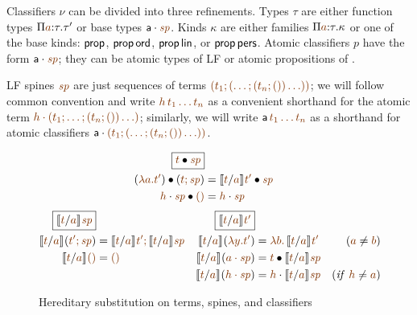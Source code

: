 \noindent
Classifiers $\nu$ can be divided into three refinements.  Types $\tau$
are either function types $\lfpi{a}{\tau}{\tau'}$ or base types
$\lfroot{\sf a}{\spi}$.  Kinds $\kappa$ are either families
$\lfpi{a}{\tau}{\kappa}$ or one of the base kinds: ${\sf prop}$, ${\sf
  prop}\,{\sf ord}$, ${\sf prop}\,{\sf lin}$, or ${\sf prop}\,{\sf
  pers}$. Atomic classifiers $p$ have the form $\lfroot{\sf a}{\spi}$;
they can be atomic types of LF or atomic propositions of \sls.

LF spines $\lf\spi$ are just sequences of terms $\lf{(t_1; (\ldots;
  (t_n;())\ldots))}$; we will follow common convention and write
$\lf{h\,t_1\ldots t_n}$ as a convenient shorthand for the atomic term
$\lf{\lfroot{h}{(t_1; \ldots; (t_n;())\ldots)}}$; similarly, we will
write ${\sf a}\,\lf{t_1\ldots t_n}$ as a shorthand for atomic
classifiers $\lfroot{\sf a}{(t_1;
  (\ldots; (t_n;())\ldots))}$. %

\begin{figure}[t]
\begin{align*}
\fbox{$\subst{\lf{t}}{\lf{\spi}}$}
\\
\subst{(\lf{\lambda a. t'})}{(\lf{t; \spi})}
 & = \subst{\rsubst{\lf{t}}{\lf{a}}{\lf{t'}}}{\lf{\spi}}
\\
\subst{\lfroot{\lf h}{\spi}}{\lfnil}
 & = \lfroot{\lf h}{\spi}
\end{align*}\begin{align*}
\fbox{$\rsubst{\lf{t}}{\lf{a}}{\lf{\spi}}$}&
&
\fbox{$\rsubst{\lf{t}}{\lf{a}}{\lf{t'}}$}&
&
\\
\rsubst{\lf t}{\lf a}{(\lf{t'; \spi})}
 & = \lf{\no{\rsubst{\lf t}{\lf a}{\lf{t'}}}; 
         \no{\rsubst{\lf t}{\lf a}{\lf{\spi}}}} &
\rsubst{\lf t}{\lf a}(\lf{\lambda y. t'})
 & = \lf{\lambda b.\, \no{\rsubst{\lf t}{\lf a}{\lf{t'}}}} 
      & (\lf a \neq \lf b) 
\\
\rsubst{\lf t}{\lf a}{\lfnil} 
 & = \lfnil &
\rsubst{\lf t}{\lf a}{(\lf{\lfroot{a}{\spi}})}
 & = \subst{\lf t}{\rsubst{\lf t}{\lf a}{\lf{\spi}}}
\\
& & 
\rsubst{\lf t}{\lf a}{(\lf{\lfroot{h}{\spi}})}
 & = \lfroot{\lf h}{\no{\rsubst{\lf t}{\lf a}{\lf{\spi}}}}
      & ({\it if}~ \lf{h} \neq \lf{a})
\end{align*}
\caption{Hereditary substitution on terms, spines, and classifiers}
\label{fig:lf-hsubst}
\end{figure}

